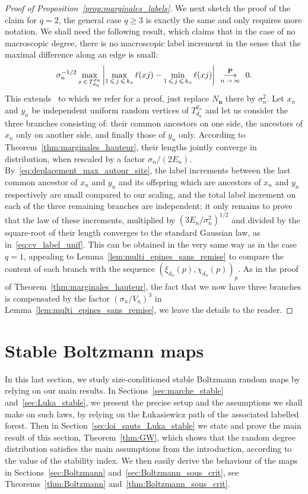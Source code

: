\documentclass[10pt]{amsart}
\theoremstyle{definition}\newtheorem{defi}[theo]{Definition}\newtheorem{rema}[theo]{Remark}\newtheorem{exam}[theo]{Example}\newtheorem{exem}[theo]{Example}\newtheorem{nota}[theo]{Notation}
\newcommand{\ensembles}[1]{\mathbf{#1}}
\renewcommand{\P}{\ensembles{P}}
\newcommand{\1}{\ensembles{1}}
\newcommand{\bfnn}{\mathbf{n}}
\renewcommand{\le}{\leqslant}
\renewcommand{\ge}{\geqslant}
\newcommand{\fn}{T_{d_n}^{\varrho_n}}
\newcommand{\edges}{E}
\newcommand{\vertices}{V}
\newcommand{\cvproba}[1][n]{\enskip\mathop{\longrightarrow}^{\P}_{#1\,\to\, \infty}\enskip}
\providecommand{\?}{}
\begin{document}
\begin{proof}[Proof of Proposition~\ref{prop:marginales_labels}]
We next sketch the proof of the claim for $q=2$, the general case $q \ge 3$ is exactly the same and only requires more notation. We shall need the following result, which claims that in the case of no macroscopic degree, there is no macroscopic label increment in the sense that the maximal difference along an edge is small:
\begin{equation}\label{eq:deplacement_max_autour_site}
\sigma_n^{-1/2} \max_{x\,\in\,\fn} \left|\max_{1\,\le\,j \,\le\,k_x} \ell(xj) - \min_{1\,\le\,j\,\le\,k_x} \ell(xj)\right| \cvproba 0.
\end{equation}
This extends~\cite[Proposition~2]{Mar18b} to which we refer for a proof, just replace $N_\bfnn$ there by $\sigma_n^2$. Let $x_n$ and $y_n$ be independent uniform random vertices of $\fn$ and let us consider the three branches consisting of: their common ancestors on one side, the ancestors of $x_n$ only on another side, and finally those of $y_n$ only. According to Theorem~\ref{thm:marginales_hauteur}, their lengths jointly converge in distribution, when rescaled by a factor $\sigma_n/(2 \edges_n)$. By~\eqref{eq:deplacement_max_autour_site}, the label increments between the last common ancestor of $x_n$ and $y_n$ and its offspring which are ancestors of $x_n$ and $y_n$ respectively are small compared to our scaling, and the total label increment on each of the three remaining branches are independent; it only remains to prove that the law of these increments, multiplied by $(3 \edges_n/\sigma_n^2)^{1/2}$ and divided by the square-root of their length converges to the standard Gaussian law, as in~\eqref{eq:cv_label_unif}. This can be obtained in the very same way as in the case $q=1$, appealing to Lemma~\ref{lem:multi_epines_sans_remise} to compare the content of each branch with the sequence $(\xi_{d_n}(p), \chi_{d_n}(p))_p$. As in the proof of Theorem~\ref{thm:marginales_hauteur}, the fact that we now have three branches is compensated by the factor $(\sigma_n / \vertices_n)^3$ in Lemma~\ref{lem:multi_epines_sans_remise}, we leave the details to the reader.
\end{proof}


\section{Stable Boltzmann maps}\label{sec:BGW_Boltzmann}

In this last section, we study size-conditioned stable Boltzmann random maps by relying on our main results. In Sections~\ref{sec:marche_stable} and~\ref{sec:Luka_stable}, we present the precise setup and the assumptions we shall make on such laws, by relying on the {\L}ukasiewicz path of the associated labelled forest. Then in Section~\ref{sec:loi_sauts_Luka_stable} we state and prove the main result of this section, Theorem~\ref{thm:GW}, which shows that the random degree distribution satisfies the main assumptions from the introduction, according to the value of the stability index. We then easily derive the behaviour of the maps in Sections~\ref{sec:Boltzmann} and~\ref{sec:Boltzmann_sous_crit}, see Theorems~\ref{thm:Boltzmann} and~\ref{thm:Boltzmann_sous_crit}.
\end{document}
